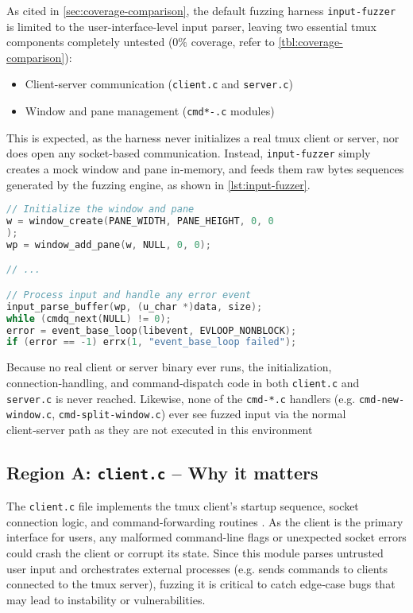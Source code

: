 As cited in \autoref{sec:coverage-comparison}, the default
fuzzing harness \texttt{input-fuzzer} is limited to the user-interface-level input
parser, leaving two essential tmux components completely untested ($0\%$ coverage, refer to \autoref{tbl:coverage-comparison}):

\begin{itemize}
	\item Client-server communication (\texttt{client.c} and \texttt{server.c})
	\item Window and pane management (\texttt{cmd*-.c} modules)
\end{itemize}

This is expected, as the harness never initializes a real tmux client or server, nor does open any socket-based communication. Instead, \texttt{input-fuzzer} simply creates a mock window and pane in-memory, and feeds them raw bytes sequences generated by the fuzzing engine, as shown in \autoref{lst:input-fuzzer}.

\begin{lstlisting}[language=C,caption={Core of the `input-fuzzer` fuzzer code, including in-memory window and pane creation},label={lst:input-fuzzer}]
// Initialize the window and pane
w = window_create(PANE_WIDTH, PANE_HEIGHT, 0, 0
);
wp = window_add_pane(w, NULL, 0, 0);

// ...

// Process input and handle any error event
input_parse_buffer(wp, (u_char *)data, size);
while (cmdq_next(NULL) != 0);
error = event_base_loop(libevent, EVLOOP_NONBLOCK);
if (error == -1) errx(1, "event_base_loop failed");
\end{lstlisting}

Because no real client or server binary ever runs, the initialization, connection‑handling, and command‑dispatch code in both \texttt{client.c} and \texttt{server.c} is never reached. Likewise, none of the \texttt{cmd-*.c} handlers (e.g. \texttt{cmd-new-window.c}, \texttt{cmd-split-window.c}) ever see fuzzed input via the normal client‑server path as they are not executed in this environment

\subsection{Region A: \texttt{client.c} – Why it matters}

The \texttt{client.c} file implements the tmux client's startup sequence, socket connection logic, and command-forwarding routines \cite{tmux:client-c}. As the client is the primary interface for users, any malformed command-line flags or unexpected socket errors could crash the client or corrupt its state. Since this module parses untrusted user input and orchestrates external processes (e.g. sends commands to clients connected to the tmux server), fuzzing it is critical to catch edge‑case bugs that may lead to instability or vulnerabilities.

